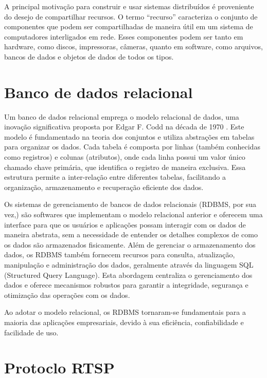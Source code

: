 \documentclass[12pt, %
openright, 
oneside, %
a4paper,    %
brazil]{facom-ufu-abntex2}
\begin{document}
A principal motivação para construir e usar sistemas distribuídos é proveniente
do desejo de compartilhar recursos. O termo “recurso” caracteriza o conjunto de
componentes que podem ser compartilhadas de maneira útil em um sistema de
computadores interligados em rede. Esses componentes podem ser tanto em
hardware, como discos, impressoras, câmeras, quanto em software, como arquivos,
bancos de dados e objetos de dados de todos os tipos.
\cite{coulouris2013sistemas}

\section{Banco de dados relacional}

Um banco de dados relacional emprega o modelo relacional de dados, uma inovação
significativa proposta por Edgar F. Codd na década de 1970
. Este modelo é fundamentado na teoria dos
conjuntos e utiliza abstrações em tabelas para organizar os dados. Cada tabela
é composta por linhas (também conhecidas como registros) e colunas (atributos),
onde cada linha possui um valor único chamado chave primária, que identifica o
registro de maneira exclusiva. Essa estrutura permite a inter-relação entre
diferentes tabelas, facilitando a organização, armazenamento e recuperação
eficiente dos dados.

Os sistemas de gerenciamento de bancos de dados relacionais (RDBMS, por sua
vez,) são softwares que implementam o modelo relacional anterior e oferecem uma
interface para que os usuários e aplicações possam interagir com os dados de
maneira abstrata, sem a necessidade de entender os detalhes complexos de como
os dados são armazenados fisicamente. Além de gerenciar o armazenamento dos
dados, os RDBMS também fornecem recursos para consulta, atualização,
manipulação e administração dos dados, geralmente através da linguagem SQL
(Structured Query Language). Esta abordagem centraliza o gerenciamento dos
dados e oferece mecanismos robustos para garantir a integridade, segurança e
otimização das operações com os dados.

Ao adotar o modelo relacional, os RDBMS tornaram-se fundamentais para a maioria
das aplicações empresariais, devido à sua eficiência, confiabilidade e
facilidade de uso.

\section{Protoclo RTSP}
\end{document}
